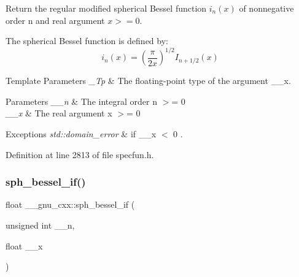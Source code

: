 Return the regular modified spherical Bessel function $ i_n(x) $ of nonnegative order n and real argument $ x >= 0 $.

The spherical Bessel function is defined by\+: \[ i_n(x) = \left(\frac{\pi}{2x} \right) ^{1/2} I_{n+1/2}(x) \]


\begin{DoxyTemplParams}{Template Parameters}
{\em \+\_\+\+Tp} & The floating-\/point type of the argument {\ttfamily \+\_\+\+\_\+x}. \\
\hline
\end{DoxyTemplParams}

\begin{DoxyParams}{Parameters}
{\em \+\_\+\+\_\+n} & The integral order {\ttfamily  n $>$= 0 } \\
\hline
{\em \+\_\+\+\_\+x} & The real argument {\ttfamily  x $>$= 0 } \\
\hline
\end{DoxyParams}

\begin{DoxyExceptions}{Exceptions}
{\em std\+::domain\+\_\+error} & if {\ttfamily  \+\_\+\+\_\+x $<$ 0 }. \\
\hline
\end{DoxyExceptions}


Definition at line 2813 of file specfun.\+h.

\mbox{\label{group__gnu__math__spec__func_gacc6738f18c1ba19452b9dd814d11c00c}} 
\subsubsection{\texorpdfstring{sph\+\_\+bessel\+\_\+if()}{sph\_bessel\_if()}}
{\footnotesize\ttfamily float \+\_\+\+\_\+gnu\+\_\+cxx\+::sph\+\_\+bessel\+\_\+if (\begin{DoxyParamCaption}\item[{unsigned int}]{\+\_\+\+\_\+n,  }\item[{float}]{\+\_\+\+\_\+x }\end{DoxyParamCaption})\hspace{0.3cm}{\ttfamily [inline]}}

